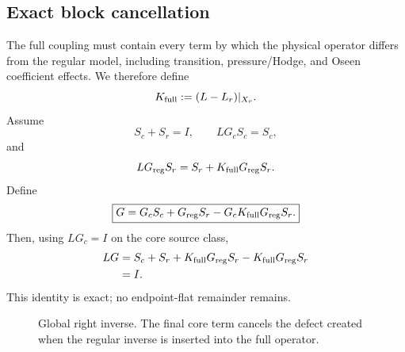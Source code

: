 \documentclass[11pt]{article}
\numberwithin{equation}{section}
\begin{document}
\subsection{Exact block cancellation}
The full coupling must contain every term by which the physical operator differs from the regular model, including transition, pressure/Hodge, and Oseen coefficient effects.  We therefore define
\begin{equation}
K_{\rm full}:=(L-L_r)|_{X_r}.
\label{eq:Kfull}
\end{equation}
Assume
\begin{equation}
S_c+S_r=I,
\qquad
LG_cS_c=S_c,
\label{eq:block1}
\end{equation}
and
\begin{equation}
LG_{\rm reg}S_r=S_r+K_{\rm full}G_{\rm reg}S_r.
\label{eq:block2}
\end{equation}
Define
\begin{equation}
\boxed{
G=G_cS_c+G_{\rm reg}S_r-G_cK_{\rm full}G_{\rm reg}S_r.}
\label{eq:Gglobal}
\end{equation}
Then, using \(LG_c=I\) on the core source class,
\begin{align}
LG
&=S_c+S_r+K_{\rm full}G_{\rm reg}S_r-K_{\rm full}G_{\rm reg}S_r\notag\\
&=I.
\label{eq:LGI}
\end{align}
This identity is exact; no endpoint-flat remainder remains.

\begin{figure}[ht]
\centering
{}

\caption{Global right inverse.  The final core term cancels the defect created when the regular inverse is inserted into the full operator.}
\label{fig:blockinverse}
\end{figure}
\end{document}
